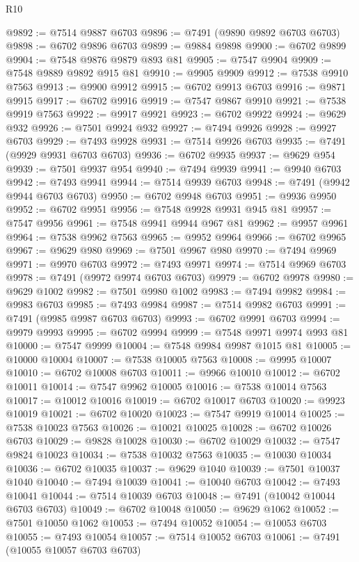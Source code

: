 \begin{lexlean}{R10}
\begin{coremodule}
{{{{{{{{{{{{{{{{{{{{{{{{{{{{{{{{{{{{{{{{{{{{{{{{{{{{{{{{{{{{{{{{{{{{{{{{{{{{{{{{{{{{@9892 := @7514 @9887 @6703
@9896 := @7491 (@9890 @9892 @6703 @6703)
@9898 := @6702 @9896 @6703
@9899 := @9884 @9898
@9900 := @6702 @9899
@9904 := @7548 @9876 @9879 @893 @81
@9905 := @7547 @9904
@9909 := @7548 @9889 @9892 @915 @81
@9910 := @9905 @9909
@9912 := @7538 @9910 @7563
@9913 := @9900 @9912
@9915 := @6702 @9913 @6703
@9916 := @9871 @9915
@9917 := @6702 @9916
@9919 := @7547 @9867 @9910
@9921 := @7538 @9919 @7563
@9922 := @9917 @9921
@9923 := @6702 @9922
@9924 := @9629 @932
@9926 := @7501 @9924 @932
@9927 := @7494 @9926
@9928 := @9927 @6703
@9929 := @7493 @9928
@9931 := @7514 @9926 @6703
@9935 := @7491 (@9929 @9931 @6703 @6703)
@9936 := @6702 @9935
@9937 := @9629 @954
@9939 := @7501 @9937 @954
@9940 := @7494 @9939
@9941 := @9940 @6703
@9942 := @7493 @9941
@9944 := @7514 @9939 @6703
@9948 := @7491 (@9942 @9944 @6703 @6703)
@9950 := @6702 @9948 @6703
@9951 := @9936 @9950
@9952 := @6702 @9951
@9956 := @7548 @9928 @9931 @945 @81
@9957 := @7547 @9956
@9961 := @7548 @9941 @9944 @967 @81
@9962 := @9957 @9961
@9964 := @7538 @9962 @7563
@9965 := @9952 @9964
@9966 := @6702 @9965
@9967 := @9629 @980
@9969 := @7501 @9967 @980
@9970 := @7494 @9969
@9971 := @9970 @6703
@9972 := @7493 @9971
@9974 := @7514 @9969 @6703
@9978 := @7491 (@9972 @9974 @6703 @6703)
@9979 := @6702 @9978
@9980 := @9629 @1002
@9982 := @7501 @9980 @1002
@9983 := @7494 @9982
@9984 := @9983 @6703
@9985 := @7493 @9984
@9987 := @7514 @9982 @6703
@9991 := @7491 (@9985 @9987 @6703 @6703)
@9993 := @6702 @9991 @6703
@9994 := @9979 @9993
@9995 := @6702 @9994
@9999 := @7548 @9971 @9974 @993 @81
@10000 := @7547 @9999
@10004 := @7548 @9984 @9987 @1015 @81
@10005 := @10000 @10004
@10007 := @7538 @10005 @7563
@10008 := @9995 @10007
@10010 := @6702 @10008 @6703
@10011 := @9966 @10010
@10012 := @6702 @10011
@10014 := @7547 @9962 @10005
@10016 := @7538 @10014 @7563
@10017 := @10012 @10016
@10019 := @6702 @10017 @6703
@10020 := @9923 @10019
@10021 := @6702 @10020
@10023 := @7547 @9919 @10014
@10025 := @7538 @10023 @7563
@10026 := @10021 @10025
@10028 := @6702 @10026 @6703
@10029 := @9828 @10028
@10030 := @6702 @10029
@10032 := @7547 @9824 @10023
@10034 := @7538 @10032 @7563
@10035 := @10030 @10034
@10036 := @6702 @10035
@10037 := @9629 @1040
@10039 := @7501 @10037 @1040
@10040 := @7494 @10039
@10041 := @10040 @6703
@10042 := @7493 @10041
@10044 := @7514 @10039 @6703
@10048 := @7491 (@10042 @10044 @6703 @6703)
@10049 := @6702 @10048
@10050 := @9629 @1062
@10052 := @7501 @10050 @1062
@10053 := @7494 @10052
@10054 := @10053 @6703
@10055 := @7493 @10054
@10057 := @7514 @10052 @6703
@10061 := @7491 (@10055 @10057 @6703 @6703)
}}}}}}}}}}}}}}}}}}}}}}}}}}}}}}}}}}}}}}}}}}}}}}}}}}}}}}}}}}}}}}}}}}}}}}}}}}}}}}}}}}}}
\end{coremodule}
\end{lexlean}
